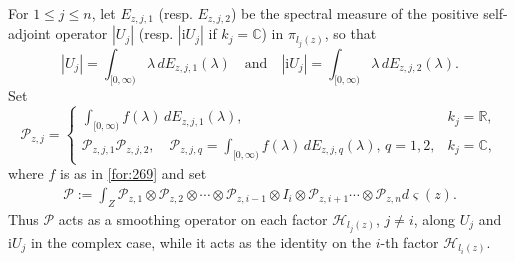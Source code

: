 \documentclass[11 pt]{amsart}
\newcommand{\CC}{\mathbb{C}}
\theoremstyle{definition}
\numberwithin{equation}{section}
\begin{document}
For $1\leq j\leq n$, let $E_{z,j,1}$ (resp. $E_{z,j,2}$) be the spectral measure of the positive self-adjoint operator $|U_j|$ (resp. $|\textrm{i}U_j|$ if $k_j=\CC$) in $\pi_{l_j(z)}$,
  so that
  \[
    |U_j| = \int_{[0,\infty)} \lambda\,dE_{z,j,1}(\lambda)\quad\text{and}\quad|\textrm{i}U_j| = \int_{[0,\infty)} \lambda\,dE_{z,j,2}(\lambda).
  \]
Set
\[
   \mathcal{P}_{z,j}=
   \begin{cases}
     \displaystyle \int_{[0,\infty)} f(\lambda)\,dE_{z,j,1}(\lambda), & k_j=\mathbb R,\\[8pt]
     \displaystyle \mathcal{P}_{z,j,1}\mathcal{P}_{z,j,2},\quad
       \mathcal{P}_{z,j,q}=\int_{[0,\infty)} f(\lambda)\,dE_{z,j,q}(\lambda),
       \,q=1,2, & k_j=\mathbb C,
   \end{cases}
\]
where $f$ is as in
\eqref{for:269} and set
\begin{align*}
 \mathcal{P}:= \int_Z \mathcal{P}_{z,1}\otimes \mathcal{P}_{z,2} \otimes\cdots \otimes \mathcal{P}_{z,i-1}\otimes I_i\otimes\mathcal{P}_{z,i+1}\cdots\otimes \mathcal{P}_{z,n} d\varsigma(z).
\end{align*}
Thus $\mathcal{P}$ acts as a smoothing operator on each factor
$\mathcal{H}_{l_j(z)}$, $j\neq i$, along $U_j$ and $\mathrm iU_j$ in the
complex case, while it acts as the identity on the $i$-th factor
$\mathcal{H}_{l_i(z)}$.
\end{document}
